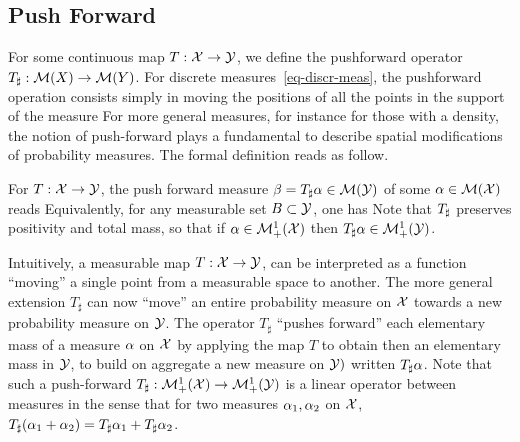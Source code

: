 \subsection{Push Forward}
  
  
For some continuous map $T : \mathcal{X} \rightarrow \mathcal{Y}$, we define the pushforward operator $T_\sharp : \mathcal{M}(X) \rightarrow \mathcal{M}(Y)$. 
%
For discrete measures~\eqref{eq-discr-meas}, the pushforward operation consists simply in moving the positions of all the points in the support of the measure
For more general measures, for instance for those with a density, the notion of push-forward plays a fundamental to describe spatial modifications of probability measures. The formal definition reads as follow.

\begin{defn}\label{defn-pushfwd}
For $T : \mathcal{X} \rightarrow \mathcal{Y}$, the push forward measure $\beta = T_\sharp \alpha \in \mathcal{M}(\mathcal{Y})$ of some $\alpha \in \mathcal{M}(\mathcal{X})$ reads
Equivalently, for any measurable set $B \subset \mathcal{Y}$, one has
Note that $T_\sharp$ preserves positivity and total mass, so that if $\alpha \in \mathcal{M}_+^1(\mathcal{X})$ then $T_\sharp \alpha \in \mathcal{M}_+^1(\mathcal{Y})$. 
\end{defn}

Intuitively, a measurable map $T: \mathcal{X}\rightarrow \mathcal{Y}$, can be interpreted as a function ``moving'' a single point from a measurable space to another. The more general extension $T_\sharp$ can now ``move'' an entire probability measure on $\mathcal{X}$ towards a new probability measure on $\mathcal{Y}$. The operator $T_\sharp$ ``pushes forward'' each elementary mass of a measure $\alpha$ on $\mathcal{X}$ by applying the map $T$ to obtain then an elementary mass in $\mathcal{Y}$, to build on aggregate a new measure on $\mathcal{Y})$ written $T_{\sharp}\alpha$.  Note that such a push-forward $T_\sharp : \mathcal{M}_+^1(\mathcal{X}) \rightarrow \mathcal{M}_+^1(\mathcal{Y})$ is a linear operator between measures in the sense that for two measures $\alpha_1,\alpha_2$ on $\mathcal{X}$, $T_\sharp(\alpha_1+\alpha_2)=T_\sharp\alpha_1+ T_\sharp\alpha_2$.



